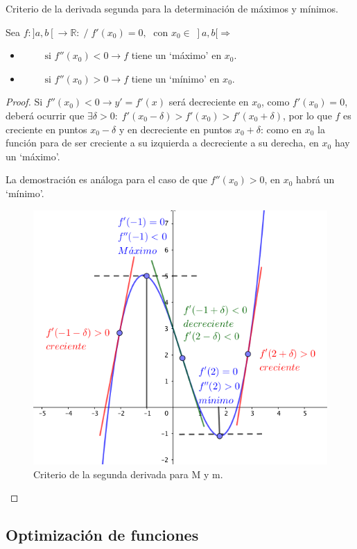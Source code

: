 	\begin{teor} Criterio de la derivada segunda para la determinación de máximos y mínimos.
	\label{teor-crit-deriv2}
		
		Sea $f:]a,b[ \to \mathbb R: \; / \; f'(x_0)=0, \; \mbox{ con } x_0\in \; ]a,b[ \Rightarrow$
		
		\begin{itemize}
			 \item $\qquad \mbox{ si } f''(x_0)<0 \to f $ tiene un `máximo' en $x_0$.
			\item $\qquad \mbox{ si } f''(x_0)>0 \to f $ tiene un `mínimo' en $x_0$.
		\end{itemize}
		
	\end{teor}
	
	\begin{proof}
		Si $f''(x_0)<0 \to y'=f'(x)$ será decreciente en $x_0$, como $f'(x_0)=0$, deberá ocurrir que $\exists \delta>0: \; f'(x_0-\delta)>f'(x_0)>f'(x_0+\delta)$, por lo que $f$ es creciente en puntos $x_0-\delta$ y en decreciente en puntos $x_0+\delta$: como en $x_0$ la función para de ser creciente a su izquierda a decreciente a su derecha, en $x_0$ hay un `máximo'.
		
		La demostración es análoga para el caso de que $f''(x_0)>0$, en $x_0$ habrá un `mínimo'.
		
		\begin{figure}[H]
		\centering
		\includegraphics[width=.5\textwidth]{imagenes/imagenes05/T05IM10.png}
		\caption{Criterio de la segunda derivada para M y m.}
	\end{figure}
		 
	\end{proof}

	
	
	\subsection{Optimización de funciones}
	
